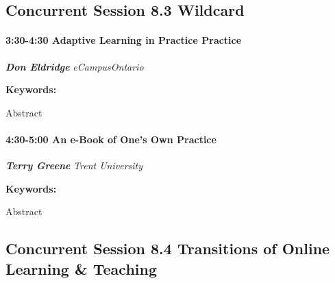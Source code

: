 \documentclass[
]{book}
\begin{document}
\hypertarget{concurrent-session-8.3-wildcard}{%
\subsection*{Concurrent Session 8.3 \textbar{} Wildcard}\label{concurrent-session-8.3-wildcard}}

\begin{session}
\hypertarget{adaptive-learning-in-practice-practice}{%
\paragraph*{\texorpdfstring{3:30-4:30 \textbar{} \textbf{Adaptive
Learning in Practice} \textbar{}
Practice}{3:30-4:30 \textbar{} Adaptive Learning in Practice \textbar{} Practice}}\label{adaptive-learning-in-practice-practice}}

\textbf{\emph{Don Eldridge}} \textbar{} \emph{eCampusOntario}

\textbf{Keywords:}

Abstract
\end{session}

\begin{session}
\hypertarget{an-e-book-of-ones-own-practice}{%
\paragraph*{\texorpdfstring{4:30-5:00 \textbar{} \textbf{An e-Book of
One's Own} \textbar{}
Practice}{4:30-5:00 \textbar{} An e-Book of One's Own \textbar{} Practice}}\label{an-e-book-of-ones-own-practice}}

\textbf{\emph{Terry Greene}} \textbar{} \emph{Trent University}

\textbf{Keywords:}

Abstract
\end{session}

\hypertarget{concurrent-session-8.4-transitions-of-online-learning-teaching}{%
\subsection*{Concurrent Session 8.4 \textbar{} Transitions of Online Learning \& Teaching}\label{concurrent-session-8.4-transitions-of-online-learning-teaching}}
\end{document}
